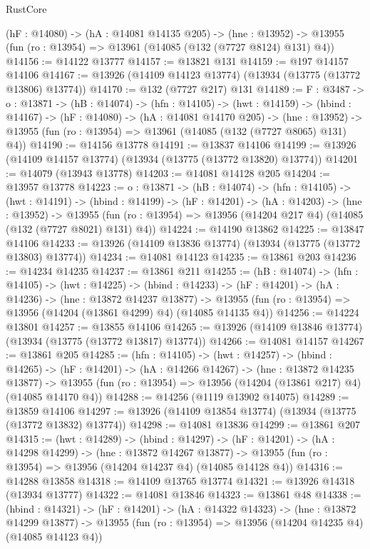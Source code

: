 \begin{lexlean}{RustCore}
\begin{coremodule}
  (hF : @14080) ->
  (hA : @14081 @14135 @205) ->
  (hne : @13952) -> @13955 (fun (ro : @13954) => @13961 (@14085 (@132 (@7727 @8124) @131) @4))
@14156 := @14122 @13777
@14157 := @13821 @131
@14159 := @197 @14157 @14106
@14167 := @13926 (@14109 @14123 @13774) (@13934 (@13775 (@13772 @13806) @13774))
@14170 := @132 (@7727 @217) @131
@14189 := {F : @3487} ->
  {o : @13871} ->
  (hB : @14074) ->
  (hfn : @14105) ->
  (hwt : @14159) ->
  (hbind : @14167) ->
  (hF : @14080) ->
  (hA : @14081 @14170 @205) ->
  (hne : @13952) -> @13955 (fun (ro : @13954) => @13961 (@14085 (@132 (@7727 @8065) @131) @4))
@14190 := @14156 @13778
@14191 := @13837 @14106
@14199 := @13926 (@14109 @14157 @13774) (@13934 (@13775 (@13772 @13820) @13774))
@14201 := @14079 (@13943 @13778)
@14203 := @14081 @14128 @205
@14204 := @13957 @13778
@14223 := {o : @13871} ->
  (hB : @14074) ->
  (hfn : @14105) ->
  (hwt : @14191) ->
  (hbind : @14199) ->
  (hF : @14201) ->
  (hA : @14203) ->
  (hne : @13952) ->
  @13955 (fun (ro : @13954) => @13956 (@14204 @217 @4) (@14085 (@132 (@7727 @8021) @131) @4))
@14224 := @14190 @13862
@14225 := @13847 @14106
@14233 := @13926 (@14109 @13836 @13774) (@13934 (@13775 (@13772 @13803) @13774))
@14234 := @14081 @14123
@14235 := @13861 @203
@14236 := @14234 @14235
@14237 := @13861 @211
@14255 := (hB : @14074) ->
  (hfn : @14105) ->
  (hwt : @14225) ->
  (hbind : @14233) ->
  (hF : @14201) ->
  (hA : @14236) ->
  (hne : @13872 @14237 @13877) ->
  @13955 (fun (ro : @13954) => @13956 (@14204 (@13861 @4299) @4) (@14085 @14135 @4))
@14256 := @14224 @13801
@14257 := @13855 @14106
@14265 := @13926 (@14109 @13846 @13774) (@13934 (@13775 (@13772 @13817) @13774))
@14266 := @14081 @14157
@14267 := @13861 @205
@14285 := (hfn : @14105) ->
  (hwt : @14257) ->
  (hbind : @14265) ->
  (hF : @14201) ->
  (hA : @14266 @14267) ->
  (hne : @13872 @14235 @13877) ->
  @13955 (fun (ro : @13954) => @13956 (@14204 (@13861 @217) @4) (@14085 @14170 @4))
@14288 := @14256 (@1119 @13902 @14075)
@14289 := @13859 @14106
@14297 := @13926 (@14109 @13854 @13774) (@13934 (@13775 (@13772 @13832) @13774))
@14298 := @14081 @13836
@14299 := @13861 @207
@14315 := (hwt : @14289) ->
  (hbind : @14297) ->
  (hF : @14201) ->
  (hA : @14298 @14299) ->
  (hne : @13872 @14267 @13877) ->
  @13955 (fun (ro : @13954) => @13956 (@14204 @14237 @4) (@14085 @14128 @4))
@14316 := @14288 @13858
@14318 := @14109 @13765 @13774
@14321 := @13926 @14318 (@13934 @13777)
@14322 := @14081 @13846
@14323 := @13861 @48
@14338 := (hbind : @14321) ->
  (hF : @14201) ->
  (hA : @14322 @14323) ->
  (hne : @13872 @14299 @13877) ->
  @13955 (fun (ro : @13954) => @13956 (@14204 @14235 @4) (@14085 @14123 @4))

\end{coremodule}
\end{lexlean}

